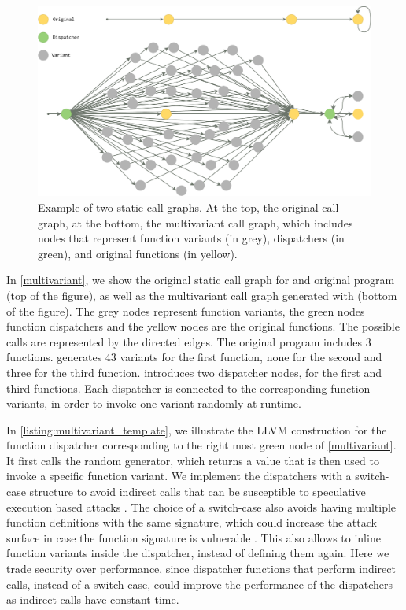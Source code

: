 \begin{figure}
    \centering
  \includegraphics[width=.8\linewidth]{diagrams/CFG.pdf}
  \caption{Example of two static call graphs. At the top, the original call graph, at the bottom, the multivariant call graph, which includes nodes that represent function variants (in grey), dispatchers (in green), and original functions  (in yellow).
}
  \label{multivariant}
\end{figure}

In \autoref{multivariant}, we show the original static call graph for and original program (top of the figure), as well as the multivariant call graph generated with \tool (bottom of the figure).
The grey nodes represent function variants, the green nodes function dispatchers and the yellow nodes are the original functions.
The possible calls are represented by the directed edges.
The original program includes 3 functions. \tool generates 43 variants for the first function, none for the second and three for the third function. 
\tool introduces two dispatcher nodes, for the first and third functions. Each dispatcher is connected to the corresponding function variants, in order to invoke one variant randomly at runtime.


In  \autoref{listing:multivariant_template}, we illustrate the LLVM construction for the function dispatcher corresponding to the right most green node of \autoref{multivariant}.
It first calls the random generator, which returns a value that is then used to invoke a specific function variant. 
We implement the dispatchers with a switch-case structure to avoid indirect calls that can be susceptible to speculative execution based attacks \cite{Narayan2021Swivel}. 
The choice of a switch-case also avoids having multiple function definitions with the same signature, which could increase the attack surface in case the function signature is vulnerable \cite{johnson2021}.
This also allows \tool to inline function variants inside the dispatcher, instead of defining them again.
Here we trade security over performance, since dispatcher functions  that perform indirect calls, instead of a switch-case,  could improve the performance  of the dispatchers as indirect calls have constant time.


